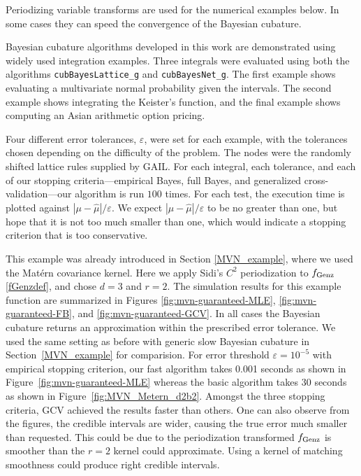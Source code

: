 \documentclass{iitthesis}          %
\newcommand{\hmu}{\widehat{\mu}}
\newcommand{\code}[1]{\texttt{#1}}
\def\abs#1{\ensuremath{\left \lvert #1 \right \rvert}}
\newcommand\figref{Figure~\ref}
\newcommand\secref{Section~\ref}
\begin{document}
Periodizing variable transforms are used for the numerical examples below.  In some cases they can speed the convergence of the Bayesian cubature. 




Bayesian cubature algorithms developed in this work are demonstrated using widely used integration examples.
Three integrals were evaluated using both the algorithms \code{cubBayesLattice\_g} and \code{cubBayesNet\_g}. The first example shows evaluating a multivariate normal probability given the intervals. The second example shows integrating the Keister's function, and the final example shows computing an Asian arithmetic option pricing.  

\label{sec:numerical_experiments_cubBayesLattice}

Four different error tolerances, $\varepsilon$,  were set for each example, with the tolerances chosen depending on the difficulty of the problem.  The nodes were the randomly shifted lattice rules supplied by GAIL.  For each integral,  each tolerance, and each of our stopping criteria---empirical Bayes, full Bayes, and generalized cross-validation---our algorithm is run  $100$ times.  For each test, the execution time is plotted against $\abs{\mu - \hmu}/\varepsilon$.  We expect $\abs{\mu - \hmu}/\varepsilon$ to be no greater than one, but hope that it is not too much smaller than one, which would indicate a stopping criterion that is too conservative.


This example was already introduced in Section \ref{MVN_example}, where we used the Mat\'ern covariance kernel.  Here we apply Sidi's $C^2$  periodization to $ f_{\textup{Genz}}$ \eqref{fGenzdef}, and chose $d=3$ and $r=2$. The simulation results for this example function are summarized in Figures \ref{fig:mvn-guaranteed-MLE}, \ref{fig:mvn-guaranteed-FB}, and \ref{fig:mvn-guaranteed-GCV}.  In all cases the Bayesian cubature returns an approximation within the prescribed error tolerance. We used the same setting as before with generic slow Bayesian cubature in \secref{MVN_example} for comparision. For error threshold $\varepsilon=10^{-5}$ with empirical stopping criterion, our fast algorithm takes 0.001 seconds as shown in \figref{fig:mvn-guaranteed-MLE} whereas the basic algorithm takes 30 seconds as shown in \figref{fig:MVN_Metern_d2b2}. 
Amongst the three stopping criteria, GCV achieved the results faster than others. 
One can also observe from the figures, the credible intervals are wider, causing the true error much smaller than requested.
This could be due to the periodization transformed $f_\textup{Genz}$ is smoother than the $r=2$ kernel could approximate. Using a kernel of matching smoothness could produce right credible intervals.
\end{document}
